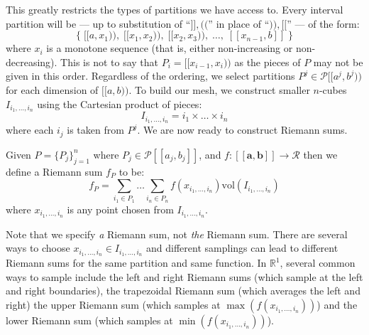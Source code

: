 This greatly restricts the types of partitions we have access to.
Every interval partition will be --- up to substitution of ``$]\!], (\!($'' in place of ``$)\!), [\![$'' --- of the form:
\begin{equation}
	\Big\{ \; [\![a,x_1)\!), \; [\![x_1, x_2)\!), \; [\![x_2, x_3)\!),\; \ldots,\; [\![x_{n-1}, b]\!] \; \Big\}
\end{equation}
where $x_i$ is a monotone sequence (that is, either non-increasing or non-decreasing).
This is not to say that $P_i = [\![x_{i-1}, x_i )\!)$ as the pieces of $P$ may not be given in this order.
Regardless of the ordering, we select partitions $P^j \in \mathcal{P}[\![a^j,b^j)\!)$ for each dimension of $[\![a,b)\!)$.
To build our mesh, we construct smaller $n$-cubes $I_{i_1, \ldots, i_n}$ using the Cartesian product of pieces:
\begin{equation}
	I_{i_1, \ldots, i_n} = i_1 \times \ldots \times i_n
\end{equation}
where each $i_j$ is taken from $P^j$.
We are now ready to construct Riemann sums.

\begin{definition}
	Given $P=\{ P_j \}_{j=1}^n$ where $P_j \in \mathcal{P}[\![a_j, b_j]\!]$,
	and $f:[\![\boldsymbol{a}, \boldsymbol{b}]\!] \to \mathcal{R}$ then we define a Riemann sum $f_P$ to be:
	\begin{equation}
		f_P = \sum_{i_1 \in P_1} \ldots \sum_{i_n \in P_n} f(x_{i_1, \ldots, i_n}) \text{vol}(I_{i_1, \ldots, i_n})
	\end{equation}
	where $x_{i_1, \ldots, i_n}$ is any point chosen from $I_{i_1, \ldots, i_n}$.
\end{definition}

Note that we specify \emph{a} Riemann sum, not \emph{the} Riemann sum.
There are several ways to choose $x_{i_1,\ldots,i_n} \in I_{i_1, \ldots, i_n}$ and different samplings can lead to different Riemann sums for the same partition and same function.
In $\mathbb{R}^1$, several common ways to sample include the left and right Riemann sums (which sample at the left and right boundaries), the trapezoidal Riemann sum (which averages the left and right) the upper Riemann sum (which samples at $\max(f(x_{i_1, \ldots, i_n}))$) and the lower Riemann sum (which samples at $\min(f(x_{i_1,\ldots,i_n}))$).

